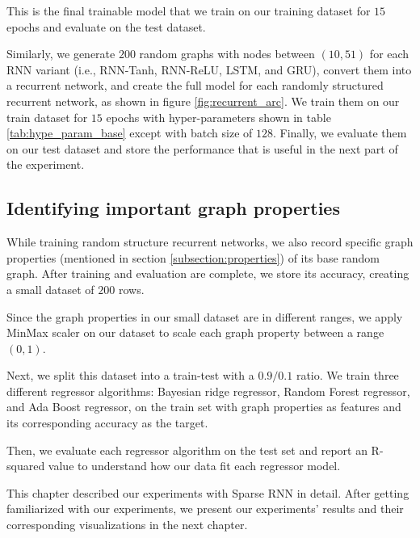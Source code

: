 This is the final trainable model that we train on our training dataset for $15$ epochs and evaluate on the test dataset.

Similarly, we generate $200$ random graphs with nodes between $(10, 51)$ for each RNN variant (i.e., RNN-Tanh, RNN-ReLU, LSTM, and GRU), convert them into a recurrent network, and create the full model for each randomly structured recurrent network, as shown in figure \ref{fig:recurrent_arc}. We train them on our train dataset for $15$ epochs with hyper-parameters shown in table \ref{tab:hype_param_base} except with batch size of $128$. Finally, we evaluate them on our test dataset and store the performance that is useful in the next part of the experiment.

\subsection{Identifying important graph properties}

While training random structure recurrent networks, we also record specific graph properties (mentioned in section \ref{subsection:properties}) of its base random graph. After training and evaluation are complete, we store its accuracy, creating a small dataset of $200$ rows.

Since the graph properties in our small dataset are in different ranges, we apply MinMax scaler on our dataset to scale each graph property between a range $(0, 1)$.

Next, we split this dataset into a train-test with a $0.9/0.1$ ratio. We train three different regressor algorithms: Bayesian ridge regressor, Random Forest regressor, and Ada Boost regressor, on the train set with graph properties as features and its corresponding accuracy as the target.

Then, we evaluate each regressor algorithm on the test set and report an R-squared value to understand how our data fit each regressor model.

This chapter described our experiments with Sparse RNN in detail. After getting familiarized with our experiments, we present our experiments' results and their corresponding visualizations in the next chapter.